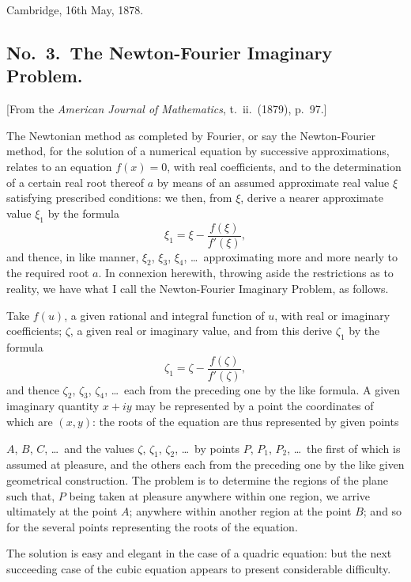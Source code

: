 \documentclass[11pt,a4paper]{article}
\begin{document}
Cambridge, 16th May, 1878.

\subsection*{No.\ 3.\ The Newton-Fourier Imaginary Problem.}

[From the \textit{American Journal of Mathematics}, t.\ ii.\ (1879), p.\ 97.]

\medskip

The Newtonian method as completed by Fourier, or say the Newton-Fourier method, for the solution of a numerical equation by successive approximations, relates to an equation $f(x) = 0$, with real coefficients, and to the determination of a certain real root thereof $a$ by means of an assumed approximate real value $\xi$ satisfying prescribed conditions: we then, from $\xi$, derive a nearer approximate value $\xi_1$ by the formula
\[
\xi_1 = \xi - \frac{f(\xi)}{f'(\xi)},
\]
and thence, in like manner, $\xi_2$, $\xi_3$, $\xi_4$, \dots\ approximating more and more nearly to the required root $a$. In connexion herewith, throwing aside the restrictions as to reality, we have what I call the Newton-Fourier Imaginary Problem, as follows.

Take $f(u)$, a given rational and integral function of $u$, with real or imaginary coefficients; $\zeta$, a given real or imaginary value, and from this derive $\zeta_1$ by the formula
\[
\zeta_1 = \zeta - \frac{f(\zeta)}{f'(\zeta)},
\]
and thence $\zeta_2$, $\zeta_3$, $\zeta_4$, \dots\ each from the preceding one by the like formula. A given imaginary quantity $x + iy$ may be represented by a point the coordinates of which are $(x, y)$: the roots of the equation are thus represented by given points

\clearpage
$A$, $B$, $C$, \dots\ and the values $\zeta$, $\zeta_1$, $\zeta_2$, \dots\ by points $P$, $P_1$, $P_2$, \dots\ the first of which is assumed at pleasure, and the others each from the preceding one by the like given geometrical construction. The problem is to determine the regions of the plane such that, $P$ being taken at pleasure anywhere within one region, we arrive ultimately at the point $A$; anywhere within another region at the point $B$; and so for the several points representing the roots of the equation.

The solution is easy and elegant in the case of a quadric equation: but the next succeeding case of the cubic equation appears to present considerable difficulty.
\end{document}
